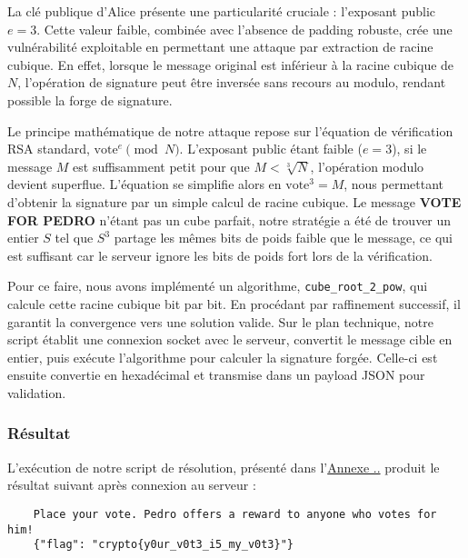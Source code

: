 La clé publique d’Alice présente une particularité cruciale : l’exposant public $e = 3$. Cette valeur faible, combinée avec l’absence de padding robuste, crée une vulnérabilité exploitable en permettant une attaque par extraction de racine cubique. En effet, lorsque le message original est inférieur à la racine cubique de $N$, l’opération de signature peut être inversée sans recours au modulo, rendant possible la forge de signature.


Le principe mathématique de notre attaque repose sur l'équation de vérification RSA standard, $\text{vote}^e \pmod{N}$. L'exposant public étant faible ($e = 3$), si le message $M$ est suffisamment petit pour que $M < \sqrt[3]{N}$, l'opération modulo devient superflue. L'équation se simplifie alors en $\text{vote}^3 = M$, nous permettant d'obtenir la signature par un simple calcul de racine cubique. Le message \textbf{VOTE FOR PEDRO} n'étant pas un cube parfait, notre stratégie a été de trouver un entier $S$ tel que $S^3$ partage les mêmes bits de poids faible que le message, ce qui est suffisant car le serveur ignore les bits de poids fort lors de la vérification.

Pour ce faire, nous avons implémenté un algorithme, \texttt{cube\_root\_2\_pow}, qui calcule cette racine cubique bit par bit. En procédant par raffinement successif, il garantit la convergence vers une solution valide. Sur le plan technique, notre script établit une connexion socket avec le serveur, convertit le message cible en entier, puis exécute l'algorithme pour calculer la signature forgée. Celle-ci est ensuite convertie en hexadécimal et transmise dans un payload JSON pour validation.

\subsubsection{Résultat}
L’exécution de notre script de résolution, présenté dans l'\hyperref[label]{Annexe ..} produit le résultat suivant après connexion au serveur :

    \begin{verbatim}
    Place your vote. Pedro offers a reward to anyone who votes for him!
    {"flag": "crypto{y0ur_v0t3_i5_my_v0t3}"}
    \end{verbatim}
